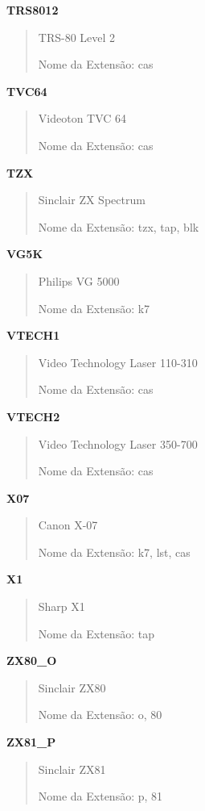 \documentclass[letterpaper,10pt,brazil]{sphinxmanual}
\begin{document}
\textbf{TRS8012}
\begin{quote}

TRS-80 Level 2

Nome da Extensão: cas
\end{quote}

\textbf{TVC64}
\begin{quote}

Videoton TVC 64

Nome da Extensão: cas
\end{quote}

\textbf{TZX}
\begin{quote}

Sinclair ZX Spectrum

Nome da Extensão: tzx, tap, blk
\end{quote}

\textbf{VG5K}
\begin{quote}

Philips VG 5000

Nome da Extensão: k7
\end{quote}

\textbf{VTECH1}
\begin{quote}

Video Technology Laser 110-310

Nome da Extensão: cas
\end{quote}

\textbf{VTECH2}
\begin{quote}

Video Technology Laser 350-700

Nome da Extensão: cas
\end{quote}

\textbf{X07}
\begin{quote}

Canon X-07

Nome da Extensão: k7, lst, cas
\end{quote}

\textbf{X1}
\begin{quote}

Sharp X1

Nome da Extensão: tap
\end{quote}

\textbf{ZX80\_O}
\begin{quote}

Sinclair ZX80

Nome da Extensão: o, 80
\end{quote}

\textbf{ZX81\_P}
\begin{quote}

Sinclair ZX81

Nome da Extensão: p, 81
\end{quote}
\end{document}

